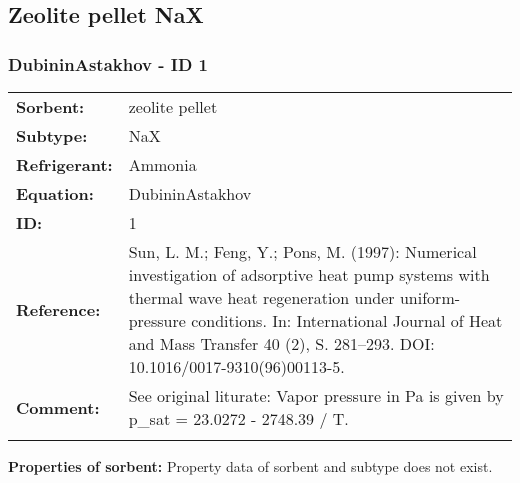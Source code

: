 \subsection{Zeolite pellet NaX}
%
\subsubsection{DubininAstakhov - ID 1}
%
\begin{tabular}[l]{|lp{11.5cm}|}
\hline
\addlinespace

\textbf{Sorbent:} & zeolite pellet \\
\textbf{Subtype:} & NaX \\
\textbf{Refrigerant:} & Ammonia \\
\textbf{Equation:} & DubininAstakhov \\
\textbf{ID:} & 1 \\
\textbf{Reference:} & Sun, L. M.; Feng, Y.; Pons, M. (1997): Numerical investigation of adsorptive heat pump systems with thermal wave heat regeneration under uniform-pressure conditions. In: International Journal of Heat and Mass Transfer 40 (2), S. 281–293. DOI: 10.1016/0017-9310(96)00113-5. \\
\textbf{Comment:} & See original liturate: Vapor pressure in Pa is given by p\_sat = 23.0272 - 2748.39 / T. \\

\addlinespace
\hline
\end{tabular}
\newline

\textbf{Properties of sorbent:}
\newline
%
Property data of sorbent and subtype does not exist.

